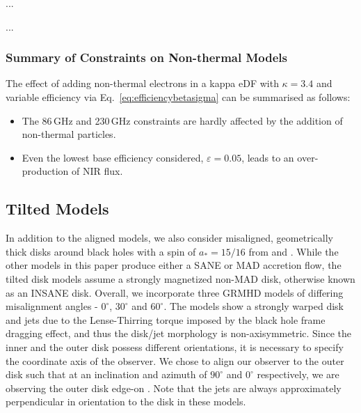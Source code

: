 
...


...


\subsubsection{Summary of Constraints on Non-thermal Models}

The effect of adding non-thermal electrons in a kappa eDF with  $\kappa=3.4$ and variable efficiency via Eq.~\ref{eq:efficiencybetasigma} can be summarised as follows:
\begin{itemize}
    \item The 86\,GHz and 230\,GHz constraints are hardly affected by the addition of non-thermal particles.
    \item Even the lowest base efficiency considered, $\varepsilon=0.05$, leads to an over-production of NIR flux. 
\end{itemize}



\subsection{Tilted Models}


In addition to the aligned models, we also consider misaligned, geometrically thick disks around black holes with a spin of $a_*=15/16$ from \citet{Liska2018} and \citet{Chatterjee2020}. While the other models in this paper produce either a SANE or MAD accretion flow, the tilted disk models assume a strongly magnetized non-MAD disk, otherwise known as an INSANE disk. Overall, we incorporate three GRMHD models of differing misalignment angles - $0^{\circ}$, $30^{\circ}$ and $60^{\circ}$. The models show a strongly warped disk and jets due to the Lense-Thirring torque imposed by the black hole frame dragging effect, and thus the disk/jet morphology is non-axisymmetric. Since the inner and the outer disk possess different orientations, it is necessary to specify the coordinate axis of the observer. We chose to align our observer to the outer disk such that at an inclination and azimuth of $90^{\circ}$ and $0^{\circ}$ respectively, we are observing the outer disk edge-on \citep[for more details, see][]{Chatterjee2020}. Note that the jets are always approximately perpendicular in orientation to the disk in these models.

